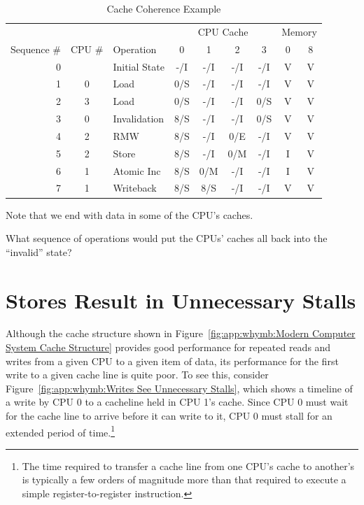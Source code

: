 \begin{table}
\small
\begin{center}
\begin{tabular}{r|c|l||c|c|c|c||c|c}
	& & & \multicolumn{4}{c||}{CPU Cache} & \multicolumn{2}{c}{Memory} \\
	\cline{4-7}
	Sequence \# & CPU \# & Operation & 0 & 1 & 2 & 3 & 0 & 8 \\
	\hline
	\hline
	0 &   & Initial State	& -/I & -/I & -/I & -/I   & V & V \\
	\hline
	1 & 0 & Load		& 0/S & -/I & -/I & -/I   & V & V \\
	\hline
	2 & 3 & Load		& 0/S & -/I & -/I & 0/S   & V & V \\
	\hline
	3 & 0 & Invalidation	& 8/S & -/I & -/I & 0/S   & V & V \\
	\hline
	4 & 2 & RMW		& 8/S & -/I & 0/E & -/I   & V & V \\
	\hline
	5 & 2 & Store		& 8/S & -/I & 0/M & -/I   & I & V \\
	\hline
	6 & 1 & Atomic Inc	& 8/S & 0/M & -/I & -/I   & I & V \\
	\hline
	7 & 1 & Writeback	& 8/S & 8/S & -/I & -/I   & V & V \\
\end{tabular}
\end{center}
\caption{Cache Coherence Example}
\label{tab:app:whymb:Cache Coherence Example}
\end{table}

Note that we end with data in some of the CPU's caches.

\QuickQuiz{}
	What sequence of operations would put the CPUs' caches
	all back into the ``invalid'' state?
 \QuickQuizEnd

\section{Stores Result in Unnecessary Stalls}
\label{sec:app:whymb:Stores Result in Unnecessary Stalls}

Although the cache structure shown in
Figure~\ref{fig:app:whymb:Modern Computer System Cache Structure}
provides good performance for repeated reads and writes from a given CPU
to a given item of data, its performance for the first write to
a given cache line is quite poor.
To see this, consider
Figure~\ref{fig:app:whymb:Writes See Unnecessary Stalls},
which shows a timeline of a write by CPU 0 to a cacheline held in
CPU 1's cache.
Since CPU 0 must wait for the cache line to arrive before it can
write to it, CPU 0 must stall for an extended period of time.\footnote{
	The time required to transfer a cache line from one CPU's cache
	to another's is typically a few orders of magnitude more than
	that required to execute a simple register-to-register instruction.}

